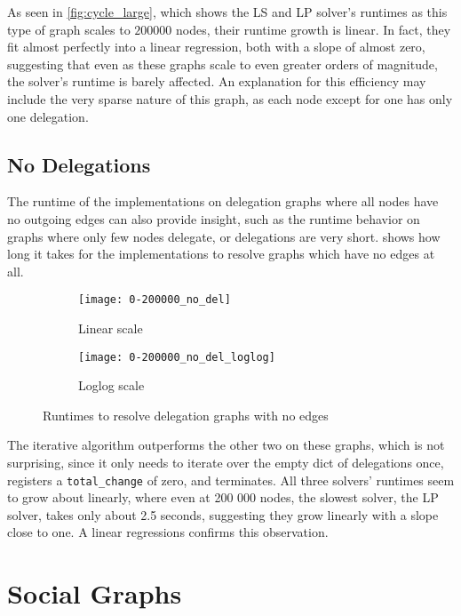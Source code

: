 As seen in \cref{fig:cycle_large}, which shows the LS and LP solver's runtimes as this type of graph scales to $200 000$ nodes, their runtime growth is linear. In fact, they fit almost perfectly into a linear regression, both with a slope of almost zero, suggesting that even as these graphs scale to even greater orders of magnitude, the solver's runtime is barely affected. An explanation for this efficiency may include the very sparse nature of this graph, as each node except for one has only one delegation.

\subsection{No Delegations}

The runtime of the implementations on delegation graphs where all nodes have no outgoing edges can also provide insight, such as the runtime behavior on graphs where only few nodes delegate, or delegations are very short.  shows how long it takes for the implementations to resolve graphs which have no edges at all. 

\begin{figure}[t]
    \centering
    \begin{subfigure}[t]{0.45\textwidth}
    	\centering
    	\texttt{[image: 0-200000\_no\_del]}
    	\caption{Linear scale}
    	\label{subfig:no-del-linear}
    \end{subfigure}
    \hfill
    \begin{subfigure}[t]{0.45\textwidth}
        \centering
        \texttt{[image: 0-200000\_no\_del\_loglog]}
        \caption{Loglog scale}
         \label{subfig:no-del-loglog}
    \end{subfigure}
    \caption{Runtimes to resolve delegation graphs with no edges}
    \label{fig:no_del}
\end{figure}


The iterative algorithm outperforms the other two on these graphs, which is not surprising, since it only needs to iterate over the empty dict of delegations once, registers a \texttt{total\_change} of zero, and terminates. All three solvers' runtimes seem to grow about linearly, where even at 200 000 nodes, the slowest solver, the LP solver, takes only about 2.5 seconds, suggesting they grow linearly with a slope close to one. A linear regressions confirms this observation. 

\section{Social Graphs}
\label{sec:social_graphs}

